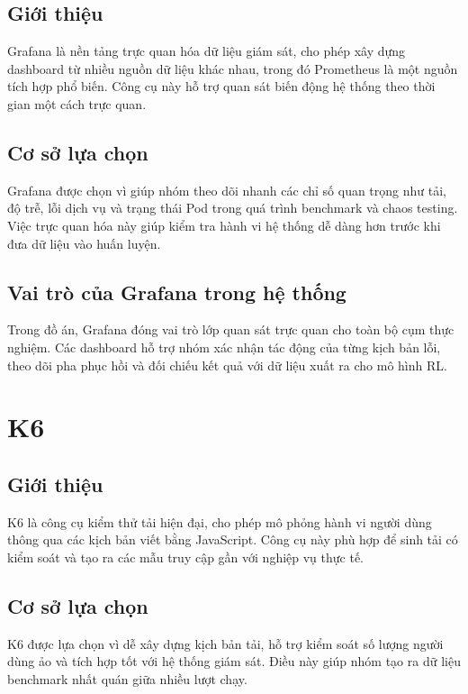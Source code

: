 \subsection{Giới thiệu}

Grafana là nền tảng trực quan hóa dữ liệu giám sát, cho phép xây dựng dashboard từ nhiều nguồn dữ liệu khác nhau, trong đó Prometheus là một nguồn tích hợp phổ biến. Công cụ này hỗ trợ quan sát biến động hệ thống theo thời gian một cách trực quan.

\subsection{Cơ sở lựa chọn}

Grafana được chọn vì giúp nhóm theo dõi nhanh các chỉ số quan trọng như tải, độ trễ, lỗi dịch vụ và trạng thái Pod trong quá trình benchmark và chaos testing. Việc trực quan hóa này giúp kiểm tra hành vi hệ thống dễ dàng hơn trước khi đưa dữ liệu vào huấn luyện.

\subsection{Vai trò của Grafana trong hệ thống}

Trong đồ án, Grafana đóng vai trò lớp quan sát trực quan cho toàn bộ cụm thực nghiệm. Các dashboard hỗ trợ nhóm xác nhận tác động của từng kịch bản lỗi, theo dõi pha phục hồi và đối chiếu kết quả với dữ liệu xuất ra cho mô hình RL.

\section{K6}

\subsection{Giới thiệu}

K6 là công cụ kiểm thử tải hiện đại, cho phép mô phỏng hành vi người dùng thông qua các kịch bản viết bằng JavaScript. Công cụ này phù hợp để sinh tải có kiểm soát và tạo ra các mẫu truy cập gần với nghiệp vụ thực tế.

\subsection{Cơ sở lựa chọn}

K6 được lựa chọn vì dễ xây dựng kịch bản tải, hỗ trợ kiểm soát số lượng người dùng ảo và tích hợp tốt với hệ thống giám sát. Điều này giúp nhóm tạo ra dữ liệu benchmark nhất quán giữa nhiều lượt chạy.

